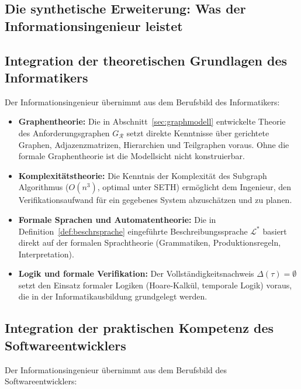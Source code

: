 ﻿\documentclass[a4paper,12pt]{report}
\theoremstyle{definition}
\begin{document}
\subsection{Die synthetische Erweiterung: Was der Informationsingenieur leistet}

\subsection{Integration der theoretischen Grundlagen des Informatikers}

Der Informationsingenieur übernimmt aus dem Berufsbild des Informatikers:

\begin{itemize}
  \item \textbf{Graphentheorie:} Die in Abschnitt~\ref{sec:graphmodell} entwickelte
        Theorie des Anforderungsgraphen $G_\mathcal{R}$ setzt direkte Kenntnisse
        über gerichtete Graphen, Adjazenzmatrizen, Hierarchien und Teilgraphen voraus.
        Ohne die formale Graphentheorie ist die Modellsicht nicht konstruierbar.
  \item \textbf{Komplexitätstheorie:} Die Kenntnis der Komplexität des Subgraph Algorithmus
        ($O(n^3)$, optimal unter SETH) ermöglicht dem Ingenieur, den Verifikationsaufwand
        für ein gegebenes System abzuschätzen und zu planen.
  \item \textbf{Formale Sprachen und Automatentheorie:}
        Die in Definition~\ref{def:beschrsprache} eingeführte Beschreibungssprache
        $\mathcal{L}^*$ basiert direkt auf der formalen Sprachtheorie
        (Grammatiken, Produktionsregeln, Interpretation).
  \item \textbf{Logik und formale Verifikation:}
        Der Vollständigkeitsnachweis $\Delta(\tau) = \emptyset$ setzt den Einsatz
        formaler Logiken (Hoare-Kalkül, temporale Logik) voraus, die in der
        Informatikausbildung grundgelegt werden.
\end{itemize}

\subsection{Integration der praktischen Kompetenz des Softwareentwicklers}

Der Informationsingenieur übernimmt aus dem Berufsbild des Softwareentwicklers:
\end{document}
